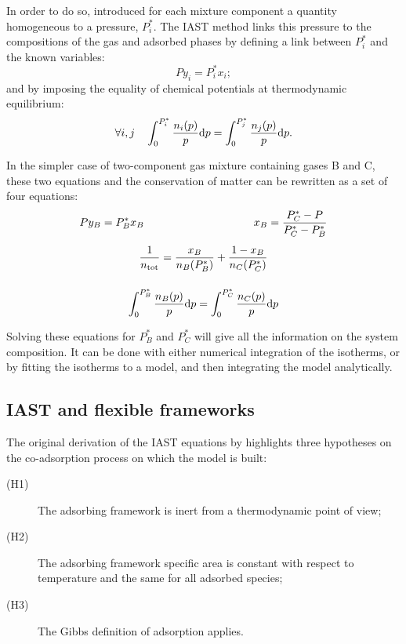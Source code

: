\documentclass[thesis]{subfiles}
\begin{document}
In order to do so, \citeauthor{Myers1965}\cite{Myers1965} introduced for each
mixture component a quantity homogeneous to a pressure, $P_i^*$. The IAST method
links this pressure to the compositions of the gas and adsorbed phases by
defining a link between $P_i^*$ and the known variables:
\[P y_i = P_i^* x_i ;\label{eq:spreading}\]
and by imposing the equality of chemical potentials at thermodynamic equilibrium:
\[\label{eq:chem-pot} \forall i,j \quad \int_0^{P_i^*} \frac{n_i(p)}{p} \text{d} p = \int_0^{P_j^*} \frac{n_j(p)}{p} \text{d} p .\]

In the simpler case of two-component gas mixture containing gases B and C, these
two equations and the conservation of matter can be rewritten as a set of four
equations:
\[\begin{gathered}
    P y_B = P_B^* x_B \kern10em x_B = \frac{P_C^* - P}{P_C^* - P_B^*} \\[0.5em]
    \frac1{n_\text{tot}} = \frac{x_B}{n_B(P_B^*)} + \frac{1 - x_B}{n_C(P_C^*)} \\[1.2em]
    \label{eq:iast}\int_0^{P_B^*} \frac{n_B(p)}{p} \d p = \int_0^{P_C^*} \frac{n_C(p)}{p} \d p
\end{gathered}\]

Solving these equations for $P_B^*$ and $P_C^*$ will give all the information on
the system composition. It can be done with either numerical integration of the
isotherms, or by fitting the isotherms to a model, and then integrating the
model analytically.

\newpage
\subsection{IAST and flexible frameworks}

The original derivation of the IAST equations\cite{Myers1965} by
\citeauthor{Myers1965} highlights three hypotheses on the co-adsorption process
on which the model is built:
\begin{description}
    \item[(H1)] The adsorbing framework is inert from a thermodynamic point of view;
    \item[(H2)] The adsorbing framework specific area is constant with respect to
                temperature and the same for all adsorbed species;
    \item[(H3)] The Gibbs definition of adsorption applies.
\end{description}
\end{document}
